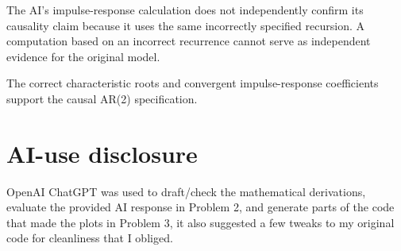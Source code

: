 \documentclass[11pt]{article}
\begin{document}
The AI's impulse-response calculation
does not independently confirm its
causality claim because it uses the same
incorrectly specified recursion.
A computation based on an incorrect
recurrence cannot serve as independent
evidence for the original model.

The correct characteristic roots and
convergent impulse-response coefficients
support the causal AR(2) specification.


\section*{AI-use disclosure}
OpenAI ChatGPT was used to draft/check the mathematical derivations, evaluate the provided AI response in Problem 2, and generate parts of the code that made the plots in Problem 3, it also suggested a few tweaks to my original code for cleanliness that I obliged. 

\appendix
\end{document}
